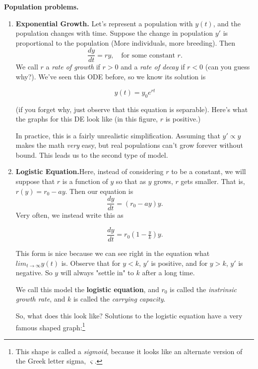 \documentclass[a5paper]{article}
\theoremstyle{definition}%
\numberwithin{exercise}{section}
\theoremstyle{remark}%
\begin{document}
\noindent \textbf{Population problems.} 
\begin{enumerate}[label=\Alph*:]
\item \textbf{Exponential Growth.} Let's represent a population with $y(t)$, and the population changes with time. Suppose the change in population $y'$ is proportional to the population (More individuals, more breeding). Then 
$$\frac{dy}{dt}=ry, \quad \text{for some constant }r.$$
We call $r$ a \emph{rate of growth} if $r>0$ and a \emph{rate of decay} if $r<0$ (can you guess why?). We've seen this ODE before, so we know its solution is 
\begin{highlight}
$$y(t)=y_0e^{rt}$$
\end{highlight}
(if you forget why, just observe that this equation is separable). Here's what the graphs for this DE look like (in this figure, $r$ is positive.)


In practice, this is a fairly unrealistic simplification. Assuming that $y' \propto y$ makes the math \emph{very} easy, but real populations can't grow forever without bound. This leads us to the second type of model.

\item \textbf{Logistic Equation.}Here, instead of considering $r$ to be a constant, we will suppose that $r$ is a function of $y$ so that as $y$ grows, $r$ gets smaller. That is, $r(y)=r_0-ay$. Then our equation is 
$$\frac{dy}{dt}=(r_0-ay)y.$$
Very often, we instead write this as 
\begin{highlight}
$$\frac{dy}{dt}=r_0\left(1-\tfrac{y}{k}\right)y.$$
\end{highlight}
This form is nice because we can see right in the equation what $
lim_{t\to\infty}y(t)$ is. Observe that for $y<k$, $y'$ is positive, and for $y>k$, $y'$ is negative. So $y$ will always "settle in" to $k$ after a long time. 

\begin{highlight}
We call this model the \textbf{logistic equation}, and $r_0$ is called the \emph{instrinsic growth rate}, and $k$ is called the \emph{carrying capacity}. 
\end{highlight}

\pagebreak
So, what does this look like? Solutions to the logistic equation have a very famous shaped graph:\footnote{This shape is called a \emph{sigmoid}, because it looks like an alternate version of the Greek letter sigma, $\varsigma$. }


\end{enumerate}
\end{document}
